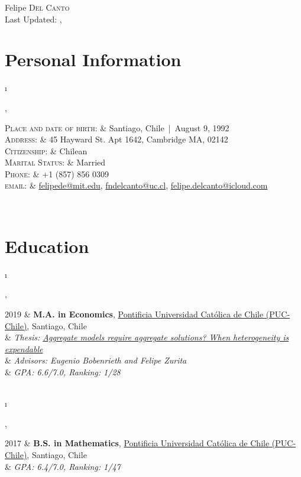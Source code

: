 \documentclass[a4paper, 10pt]{article}
\newcommand{\tablength}{}
\newcommand{\setTabParams}[1]{\renewcommand\tablength{}\forcsvlist{\listadd\tablength}{#1}}
\newcommand{\setCols}[1]{			%
	\ifnum0=\i						%
		\ifdim0cm=#1				%
			\def \firstCol {r}		%
		\else						%
			\def \firstCol {p{#1}}	%
		\fi							%
	\else \ifnum1=\i				%
		\ifdim0cm=#1				%
			\def \secondCol {l}		%
		\else						%
			\def \secondCol{p{#1}}	%
		\fi							%
	\else \ifnum2=\i				%
		\ifnum0=#1					%
			\def \sep {}			%
		\else						%
			\def \sep {|}			%
		\fi							%
	\fi \fi \fi						%
	\advance\i by1					%
}
\newcommand{\tab}[1]{							%
	\newcount\i									%
	\forlistloop{\setCols}{\tablength}			%
	\begin{tabular}{\firstCol \sep \secondCol}	%
		#1										%
	\end{tabular} \\[.5ex]						%
}
\begin{document}
\pagestyle{empty} 

\par{\centering
		{{\Huge Felipe \textsc{Del Canto}}	\\[1.5ex]
		 {\large Last Updated: \monthname, \the\year }
	}\par}

\section{Personal Information}
\setTabParams{0cm,0cm,0}

\tab{
    \textsc{Place and date of birth:}	&	Santiago, Chile\,  |\, August 9, 1992							\\[0.2ex]
    \textsc{Address:}   				&	45 Hayward St. Apt 1642, Cambridge MA, 02142					\\[0.2ex]
    \textsc{Citizenship:}				&	Chilean															\\[0.2ex]
    \textsc{Marital Status:}			&	Married															\\[0.2ex]
    \textsc{Phone:}	   					&	+1 (857) 856 0309												\\[0.2ex]
    \textsc{email:}     				&	\href{mailto:felipede@mit.edu}{felipede@mit.edu}, \href{mailto:fndelcanto@uc.cl}{fndelcanto@uc.cl},
    								\href{mailto:felipe.delcanto@icloud.com}{felipe.delcanto@icloud.com}
}

\section{Education}
\setTabParams{0cm,0cm,0}

\tab{
\textsc{2019}
	&	\textbf{M.A. in Economics}, \href{https://economia.uc.cl/programas-academicos/magister-en-economia/}{Pontificia Universidad Católica de Chile (PUC-Chile)}, Santiago, Chile											\\[0.2ex]
	&	\emph{\quad Thesis: \href{https://economia.uc.cl/wp-content/uploads/2020/01/tesis-DelCanto-2019.pdf}{Aggregate models require aggregate solutions? When heterogeneity is expendable}}				\\[0.2ex]
	&	\emph{\quad Advisors: Eugenio Bobenrieth and Felipe Zurita}	\\[0.2ex]
	&	\emph{\quad GPA: 6.6/7.0, Ranking: 1/28}
}

\tab{
\textsc{2017}
	& 	\textbf{B.S. in Mathematics}, \href{http://www.mat.uc.cl/?lang=en}{Pontificia Universidad Católica de Chile (PUC-Chile)}, Santiago, Chile	\\[0.2ex]
	&	\emph{\quad GPA: 6.4/7.0, Ranking: 1/47}
}
\end{document}
